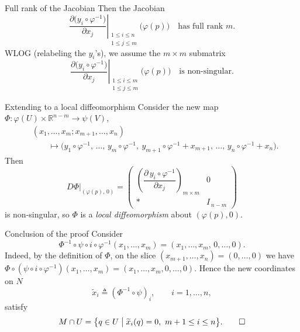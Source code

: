 \documentclass[10pt]{beamer}
\newcommand{\R}{\mathbb{R}}
\begin{document}
\begin{frame}{Full rank of the Jacobian}
	Then the Jacobian
	\[
		\left.
		\frac{\partial \bigl( y_{i} \circ \varphi^{-1} \bigr)}
		{\partial x_{j}}
		\right|_{\substack{1 \leq i \leq n \\ 1 \leq j \leq m}}
		\bigl( \varphi(p) \bigr)
		\quad \text{has full rank } m.
	\]
	WLOG (relabeling the $y_{i}$'s), we assume the $m \times m$
	submatrix
	\[
		\left.
		\frac{\partial \bigl( y_{i} \circ \varphi^{-1} \bigr)}
		{\partial x_{j}}
		\right|_{\substack{1 \leq i \leq m \\ 1 \leq j \leq m}}
		\bigl( \varphi(p) \bigr)
		\quad \text{is non-singular.}
	\]
\end{frame}

\begin{frame}{Extending to a local diffeomorphism}
	Consider the new map $\Phi : \varphi(U) \times \R^{n-m}
		\longrightarrow \psi(V)$,
	\begin{align*}
		 & (x_{1}, \dots, x_{m}; x_{m+1}, \dots, x_{n}) \\
		 & \qquad \longmapsto
		\bigl(
		y_{1} \circ \varphi^{-1},\, \dots,\, y_{m} \circ \varphi^{-1},\
		y_{m+1} \circ \varphi^{-1} + x_{m+1},\, \dots,\,
		y_{n} \circ \varphi^{-1} + x_{n}
		\bigr).
	\end{align*}
	Then
	\[
		D \Phi \Big|_{(\varphi(p),\, 0)}
		=
		\begin{pmatrix}
			\left( \dfrac{\partial \, y_{i} \circ \varphi^{-1}}
			{\partial x_{j}} \right)_{\! m \times m} & 0               \\[8pt]
			*                                                   & I_{\, n-m}
		\end{pmatrix}
	\]
	is non-singular, so $\Phi$ is a \emph{local diffeomorphism} about
	$(\varphi(p), 0)$.
\end{frame}

\begin{frame}{Conclusion of the proof}
	Consider
	\[
		\Phi^{-1} \circ \psi \circ i \circ \varphi^{-1}
		(x_{1}, \dots, x_{m})
		= (x_{1}, \dots, x_{m},\, 0, \dots, 0).
	\]
	Indeed, by the definition of $\Phi$, on the slice
	$(x_{m+1}, \dots, x_{n}) = (0, \dots, 0)$ we have
	$\Phi \circ (\psi \circ i \circ \varphi^{-1}) (x_{1}, \dots, x_{m})
		= (x_{1}, \dots, x_{m}, 0, \dots, 0)$.
	Hence the new coordinates on $N$
	\[
		\widetilde{x}_{i} \triangleq (\Phi^{-1} \circ \psi)_{i},
		\qquad i = 1, \dots, n,
	\]
	satisfy
	\[
		M \cap U
		= \bigl\{ q \in U \bigm|
		\widetilde{x}_{i}(q) = 0,\ m+1 \leq i \leq n \bigr\}.
		\qed
	\]
\end{frame}
\end{document}
